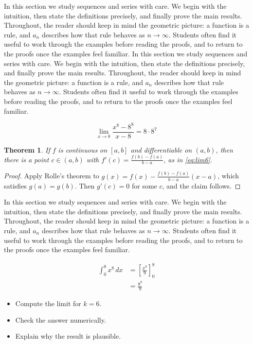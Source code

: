 \documentclass[11pt]{article}
\newtheorem{theorem}{Theorem}[section]
\begin{document}
In this section we study sequences and series with care. We begin with the intuition, then state the definitions precisely, and finally prove the main results. Throughout, the reader should keep in mind the geometric picture: a function is a rule, and $a_n$ describes how that rule behaves as $n \to \infty$. Students often find it useful to work through the examples before reading the proofs, and to return to the proofs once the examples feel familiar. In this section we study sequences and series with care. We begin with the intuition, then state the definitions precisely, and finally prove the main results. Throughout, the reader should keep in mind the geometric picture: a function is a rule, and $a_n$ describes how that rule behaves as $n \to \infty$. Students often find it useful to work through the examples before reading the proofs, and to return to the proofs once the examples feel familiar. 

\begin{equation}
  \lim_{x \to 8} \frac{x^{8} - 8^{8}}{x - 8} = 8 \cdot 8^{7}
  \label{eq:lim6}
\end{equation}

\begin{theorem}
If $f$ is continuous on $[a,b]$ and differentiable on $(a,b)$, then there is a point $c \in (a,b)$ with $f'(c) = \frac{f(b)-f(a)}{b-a}$, as in \eqref{eq:lim6}.
\end{theorem}

\begin{proof}
Apply Rolle's theorem to $g(x) = f(x) - \frac{f(b)-f(a)}{b-a}(x-a)$, which satisfies $g(a) = g(b)$. Then $g'(c) = 0$ for some $c$, and the claim follows.
\end{proof}

In this section we study sequences and series with care. We begin with the intuition, then state the definitions precisely, and finally prove the main results. Throughout, the reader should keep in mind the geometric picture: a function is a rule, and $a_n$ describes how that rule behaves as $n \to \infty$. Students often find it useful to work through the examples before reading the proofs, and to return to the proofs once the examples feel familiar. 

\begin{align}
  \int_0^{8} x^{8}\,dx &= \left[ \frac{x^{9}}{9} \right]_0^{8} \\
  &= \frac{8^{9}}{9} \label{eq:int6}
\end{align}

\begin{itemize}
  \item Compute the limit for $k = 6$.
  \item Check the answer numerically.
  \item Explain why the result is plausible.
\end{itemize}
\end{document}
